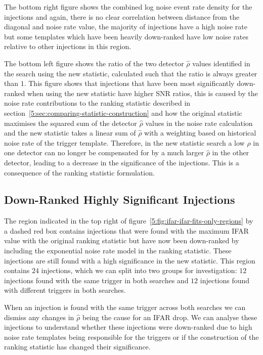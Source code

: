 The bottom right figure shows the combined log noise event rate density for the injections and again, there is no clear correlation between distance from the diagonal and noise rate value, the majority of injections have a high noise rate but some templates which have been heavily down-ranked have low noise rates relative to other injections in this region.

The bottom left figure shows the ratio of the two detector $\hat{\rho}$ values identified in the search using the new statistic, calculated such that the ratio is always greater than $1$. This figure shows that injections that have been most significantly down-ranked when using the new statistic have higher SNR ratios, this is caused by the noise rate contributions to the ranking statistic described in section~\ref{5:sec:comparing-statistic-construction} and how the original statistic maximises the squared sum of the detector $\hat{\rho}$ values in the noise rate calculation and the new statistic takes a linear sum of $\hat{\rho}$ with a weighting based on historical noise rate of the trigger template. Therefore, in the new statistic search a low $\hat{\rho}$ in one detector can no longer be compensated for by a much larger $\hat{\rho}$ in the other detector, leading to a decrease in the significance of the injections. This is a consequence of the ranking statistic formulation.

\subsection{\label{5:sec:top-right-region}Down-Ranked Highly Significant Injections}

The region indicated in the top right of figure~\ref{5:fig:ifar-ifar-fits-only-regions} by a dashed red box contains injections that were found with the maximum IFAR value with the original ranking statistic but have now been down-ranked by including the exponential noise rate model in the ranking statistic. These injections are still found with a high significance in the new statistic. This region contains $24$ injections, which we can split into two groups for investigation: $12$ injections found with the same trigger in both searches and $12$ injections found with different triggers in both searches. 

When an injection is found with the same trigger across both searches we can dismiss any changes in $\hat{\rho}$ being the cause for an IFAR drop. We can analyse these injections to understand whether these injections were down-ranked due to high noise rate templates being responsible for the triggers or if the construction of the ranking statistic has changed their significance.

